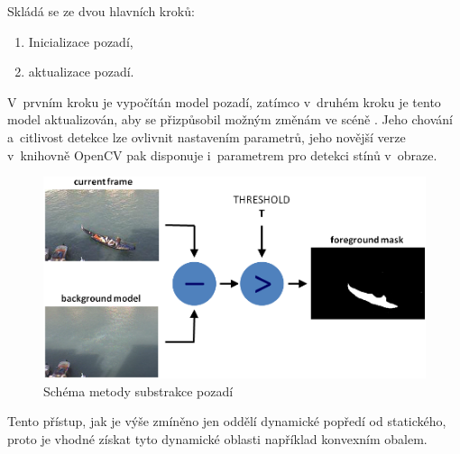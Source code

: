 Skládá se ze dvou hlavních kroků:
 \begin{enumerate}
    \item{Inicializace pozadí,}
    \item{aktualizace pozadí.}
 \end{enumerate}
 V~prvním kroku je vypočítán model pozadí, zatímco v~druhém kroku je tento model aktualizován, aby se přizpůsobil možným změnám ve scéně \cite{openCV:MOG}.
Jeho chování a~citlivost detekce lze ovlivnit nastavením parametrů, jeho novější verze v~knihovně OpenCV pak disponuje i~parametrem pro detekci stínů v~obraze.
\begin{figure}[H]
  \centering
  \includegraphics[width=14cm]{figures/mog_scheme}
  \caption{Schéma metody substrakce pozadí \cite{openCV:MOG}}
  \label{mog_scheme}
\end{figure}

Tento přístup, jak je výše zmíněno jen oddělí dynamické popředí od statického, proto je vhodné získat tyto dynamické oblasti například konvexním obalem.

